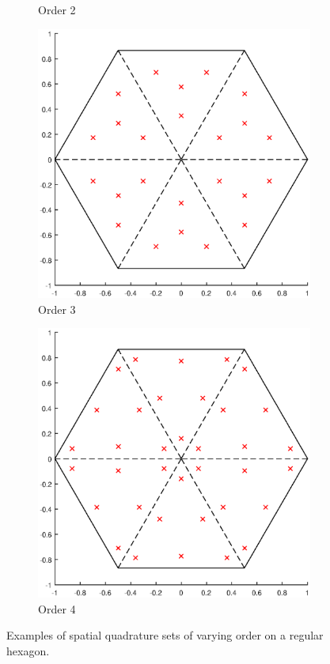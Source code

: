 \begin{figure}
{\begin{subfigure}[b]{0.475\textwidth}
		\caption{Order 2}
	\end{subfigure}
}
\vspace{3mm}
{
	\begin{subfigure}[b]{0.475\textwidth}
		\centering
		\label{subfig::2DInt_V6_Q3}
		\includegraphics[width=\textwidth]{figures/sec_BF/V6_Q3.eps}
		\caption{Order 3}
	\end{subfigure}
	\hfill
	\begin{subfigure}[b]{0.475\textwidth}
		\centering
		\label{subfig::2DInt_V6_Q4}
		\includegraphics[width=\textwidth]{figures/sec_BF/V6_Q4.eps}
		\caption{Order 4}
	\end{subfigure}
}
\caption{Examples of spatial quadrature sets of varying order on a regular hexagon.}
\label{fig::BF_2DIntegration_Hexagon}
\end{figure}

